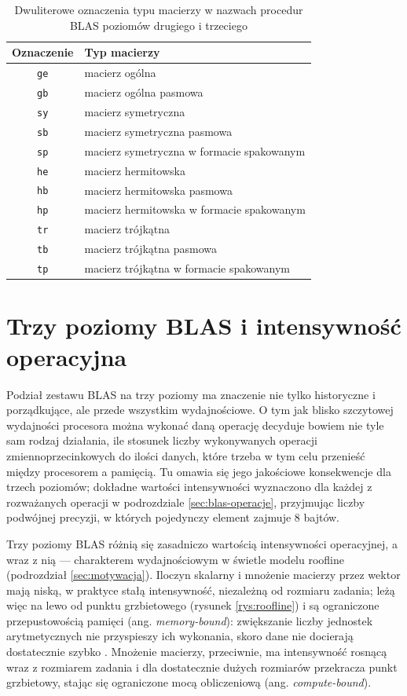 \documentclass[a4paper,12pt]{book} %
\begin{document}
\begin{table}[t!]
\centering
\caption{Dwuliterowe oznaczenia typu macierzy w nazwach procedur BLAS poziomów drugiego i trzeciego}
\label{tab:blas-macierze}
\begin{tabular}{cl}
\hline
Oznaczenie & Typ macierzy \\
\hline
\texttt{ge} & macierz ogólna \\
\texttt{gb} & macierz ogólna pasmowa \\
\texttt{sy} & macierz symetryczna \\
\texttt{sb} & macierz symetryczna pasmowa \\
\texttt{sp} & macierz symetryczna w formacie spakowanym \\
\texttt{he} & macierz hermitowska \\
\texttt{hb} & macierz hermitowska pasmowa \\
\texttt{hp} & macierz hermitowska w formacie spakowanym \\
\texttt{tr} & macierz trójkątna \\
\texttt{tb} & macierz trójkątna pasmowa \\
\texttt{tp} & macierz trójkątna w formacie spakowanym \\
\hline
\end{tabular}
\end{table}

\section{Trzy poziomy BLAS i intensywność operacyjna}
\label{sec:blas-poziomy}

Podział zestawu BLAS na trzy poziomy ma znaczenie nie tylko historyczne i porządkujące, ale przede wszystkim wydajnościowe. O tym jak blisko szczytowej wydajności procesora można wykonać daną operację decyduje bowiem nie tyle sam rodzaj działania, ile stosunek liczby wykonywanych operacji zmiennoprzecinkowych do ilości danych, które trzeba w tym celu przenieść między procesorem a pamięcią. Tu omawia się jego jakościowe konsekwencje dla trzech poziomów; dokładne wartości intensywności wyznaczono dla każdej z rozważanych operacji w podrozdziale \ref{sec:blas-operacje}, przyjmując liczby podwójnej precyzji, w których pojedynczy element zajmuje 8 bajtów.

Trzy poziomy BLAS różnią się zasadniczo wartością intensywności operacyjnej, a wraz z nią --- charakterem wydajnościowym w świetle modelu roofline (podrozdział \ref{sec:motywacja}). Iloczyn skalarny i mnożenie macierzy przez wektor mają niską, w praktyce stałą intensywność, niezależną od rozmiaru zadania; leżą więc na lewo od punktu grzbietowego (rysunek \ref{rys:roofline}) i są ograniczone przepustowością pamięci (ang. \emph{memory-bound}): zwiększanie liczby jednostek arytmetycznych nie przyspieszy ich wykonania, skoro dane nie docierają dostatecznie szybko \cite{williams2009roofline}. Mnożenie macierzy, przeciwnie, ma intensywność rosnącą wraz z rozmiarem zadania i dla dostatecznie dużych rozmiarów przekracza punkt grzbietowy, stając się ograniczone mocą obliczeniową (ang. \emph{compute-bound}).
\end{document}
